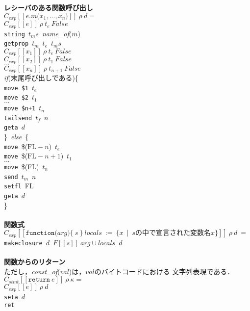 \documentclass[a4j,12pt]{jarticle}
\begin{document}
{\begin{tabbing}
\textbf{レシーバのある関数呼び出し} \\
\>$C_{exp}[[e.m\texttt{(}x_1, ... , x_n\texttt{)}]]\ \rho\ d=$ \\
\>\>$C_{exp}[[e]]\ \rho\ t_e\ False$ \\
\>\>\texttt{string}\ $t_ms$\ \textit{name\_of}($m$) \\
\>\>\texttt{getprop}\ $t_m$\ $t_e$\ $t_ms$ \\
\>\>$C_{exp}[[x_1]]\ \rho\ t_e\ False$ \\
\>\>$C_{exp}[[x_2]]\ \rho\ t_1\ False$ \\
\>\>$...$ \\
\>\>$C_{exp}[[x_n]]\ \rho\ t_{n+1}\ False$ \\
\>\>\textit{if}(末尾呼び出しである)\{ \\
\>\>\>\texttt{move}\ \texttt{\$1}\ $t_e$ \\
\>\>\>\texttt{move}\ \texttt{\$2}\ $t_1$ \\
\>\>\>$...$ \\
\>\>\>\texttt{move}\ \texttt{\$n+1}\ $t_n$ \\
\>\>\>\texttt{tailsend}\ $t_f$\ $n$ \\
\>\>\>\texttt{geta}\ $d$ \\
\>\>\}\ \textit{else}\ \{ \\
\>\>\>\texttt{move}\ \$($\textrm{FL}-n$)\ $t_e$ \\
\>\>\>\texttt{move}\ \$($\textrm{FL}-n+1$)\ $t_1$ \\
\>\>\>$...$ \\
\>\>\>\texttt{move}\ \$(FL)\ $t_n$ \\
\>\>\>\texttt{send}\ $t_m$\ $n$ \\
\>\>\>\texttt{setfl}\ FL \\
\>\>\>\texttt{geta}\ $d$ \\
\>\>\} \\
\\

\textbf{関数式} \\
\>$C_{exp}[[\texttt{function(}arg\texttt{)\{}\ s\ \texttt{\}}\ 
  locals\ :=\ \{x\ \mid\ sの中で宣言された変数名x\}]]\ \rho\ d\ =$ \\
\>\>\texttt{makeclosure}\ $d$\ $F[[s]]\ arg\cup locals$\ $d$ \\
\\

\textbf{関数からのリターン} \\
ただし，\textit{const\_of}($val$)は，$val$のバイトコードにおける
文字列表現である．\\
\>$ C_{stmt}[[\texttt{return}\ e]]\ \rho\ \kappa =$ \\
\>\>$C_{exp}[[e]]\ \rho\ d $ \\
\>\>\texttt{seta}\ $d$ \\
\>\>\texttt{ret} \\

\end{tabbing}
}
\end{document}

